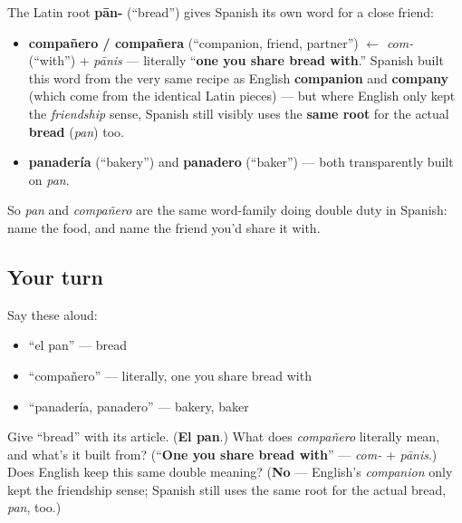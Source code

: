 \begin{culture}
The Latin root \textbf{pān-} (\textquotedblleft{}bread\textquotedblright{}) gives Spanish its own word for a close friend:

\begin{itemize}
\raggedright
  \item \textbf{compañero / compañera} (\textquotedblleft{}companion, friend, partner\textquotedblright{}) $\leftarrow$ \emph{com-} (\textquotedblleft{}with\textquotedblright{}) + \emph{pānis} — literally \textquotedblleft{}\textbf{one you share bread with}.\textquotedblright{} Spanish built this word from the very same recipe as English \textbf{companion} and \textbf{company} (which come from the identical Latin pieces) — but where English only kept the \emph{friendship} sense, Spanish still visibly uses the \textbf{same root} for the actual \textbf{bread} (\emph{pan}) too.
  \item \textbf{panadería} (\textquotedblleft{}bakery\textquotedblright{}) and \textbf{panadero} (\textquotedblleft{}baker\textquotedblright{}) — both transparently built on \emph{pan}.
\end{itemize}

So \emph{pan} and \emph{compañero} are the same word-family doing double duty in Spanish: name the food, and name the friend you'd share it with.
\end{culture}

\subsection*{Your turn}
Say these aloud:

\begin{itemize}
\raggedright
  \item \textquotedblleft{}el pan\textquotedblright{} — bread
  \item \textquotedblleft{}compañero\textquotedblright{} — literally, one you share bread with
  \item \textquotedblleft{}panadería, panadero\textquotedblright{} — bakery, baker
\end{itemize}

\begin{tcolorbox}[breakable,colback=teal!4,colframe=teal!35!black,title={Before you move on}]
Give \textquotedblleft{}bread\textquotedblright{} with its article. (\textbf{El pan}.) What does \emph{compañero} literally mean, and what's it built from? (\textquotedblleft{}\textbf{One you share bread with}\textquotedblright{} — \emph{com-} + \emph{pānis}.) Does English keep this same double meaning? (\textbf{No} — English's \emph{companion} only kept the friendship sense; Spanish still uses the same root for the actual bread, \emph{pan}, too.)
\end{tcolorbox}

